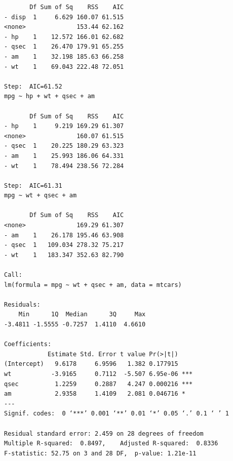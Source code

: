 \documentclass{article}\usepackage[]{graphicx}\usepackage[]{xcolor}
\begin{document}
\begin{verbatim}
       Df Sum of Sq    RSS    AIC
- disp  1     6.629 160.07 61.515
<none>              153.44 62.162
- hp    1    12.572 166.01 62.682
- qsec  1    26.470 179.91 65.255
- am    1    32.198 185.63 66.258
- wt    1    69.043 222.48 72.051

Step:  AIC=61.52
mpg ~ hp + wt + qsec + am

       Df Sum of Sq    RSS    AIC
- hp    1     9.219 169.29 61.307
<none>              160.07 61.515
- qsec  1    20.225 180.29 63.323
- am    1    25.993 186.06 64.331
- wt    1    78.494 238.56 72.284

Step:  AIC=61.31
mpg ~ wt + qsec + am

       Df Sum of Sq    RSS    AIC
<none>              169.29 61.307
- am    1    26.178 195.46 63.908
- qsec  1   109.034 278.32 75.217
- wt    1   183.347 352.63 82.790

Call:
lm(formula = mpg ~ wt + qsec + am, data = mtcars)

Residuals:
    Min      1Q  Median      3Q     Max 
-3.4811 -1.5555 -0.7257  1.4110  4.6610 

Coefficients:
            Estimate Std. Error t value Pr(>|t|)    
(Intercept)   9.6178     6.9596   1.382 0.177915    
wt           -3.9165     0.7112  -5.507 6.95e-06 ***
qsec          1.2259     0.2887   4.247 0.000216 ***
am            2.9358     1.4109   2.081 0.046716 *  
---
Signif. codes:  0 ‘***’ 0.001 ‘**’ 0.01 ‘*’ 0.05 ‘.’ 0.1 ‘ ’ 1

Residual standard error: 2.459 on 28 degrees of freedom
Multiple R-squared:  0.8497,	Adjusted R-squared:  0.8336 
F-statistic: 52.75 on 3 and 28 DF,  p-value: 1.21e-11
\end{verbatim}
\end{document}
